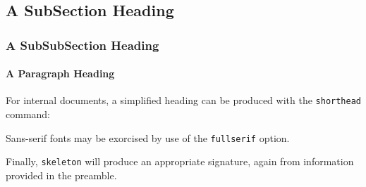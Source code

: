 \documentclass[10pt, oneside, detailedhead]{skeleton}
\begin{document}
	\subsection{A SubSection Heading} %
	\label{sub:a_subsection_heading}
	
	\subsubsection{A SubSubSection Heading} %
	\label{ssub:a_subsubsection_heading}
	
	\paragraph{A Paragraph Heading} %
	\label{par:a_paragraph_heading}
	
	\pa For internal documents, a simplified heading can be produced with the \texttt{shorthead} command:

\shorthead

	\pa Sans-serif fonts may be exorcised by use of the \texttt{fullserif} option.
	
	\pa Finally, \texttt{skeleton} will produce an appropriate signature, again from information provided in the preamble. \label{sig}
		
\sign


	
\end{document}
